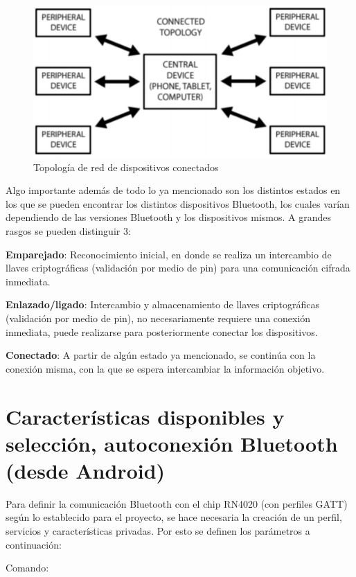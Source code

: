 \begin{figure}[H]
	\centering
	\includegraphics[scale=0.4]{figuras/rn4020/topologia.png}
	\caption{ Topología de red de dispositivos conectados \cite{RN4020}}
	\label{topologia}
\end{figure}

Algo importante además de todo lo ya mencionado son los distintos estados en los que se pueden encontrar los distintos dispositivos Bluetooth, los cuales varían dependiendo de las versiones Bluetooth y los dispositivos mismos. A grandes rasgos se pueden distinguir 3:

\textbf{Emparejado}: Reconocimiento inicial, en donde se realiza un intercambio de llaves criptográficas (validación por medio de pin) para una comunicación cifrada inmediata.

\textbf{Enlazado/ligado}: Intercambio y almacenamiento de llaves criptográficas (validación por medio de pin), no necesariamente requiere una conexión inmediata, puede realizarse para posteriormente conectar los dispositivos.

\textbf{Conectado}: A partir de algún estado ya mencionado, se continúa con la conexión misma, con la que se espera intercambiar la información objetivo.
\newpage

\section{Características disponibles y selección, autoconexión Bluetooth (desde Android)}

Para definir la comunicación Bluetooth con el chip RN4020 (con perfiles GATT) según lo establecido para el proyecto, se hace necesaria la creación de un perfil, servicios y características privadas. Por esto se definen los parámetros a continuación:

Comando: 

